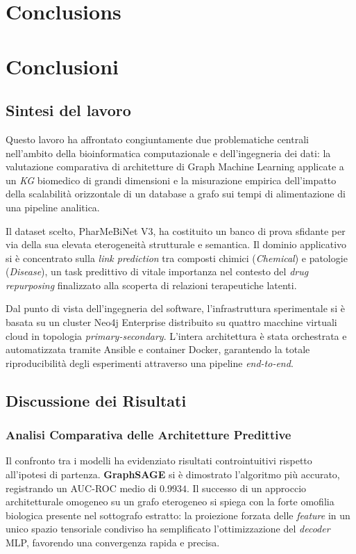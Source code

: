 {\chapter{Conclusions}}
{\chapter{Conclusioni}}
\label{sec:conclusion}

\section{Sintesi del lavoro}
Questo lavoro ha affrontato congiuntamente due problematiche centrali nell'ambito della bioinformatica computazionale e dell'ingegneria dei dati: la valutazione comparativa di architetture di Graph Machine Learning applicate a un \textit{KG} biomedico di grandi dimensioni e la misurazione empirica dell'impatto della scalabilità orizzontale di un database a grafo sui tempi di alimentazione di una pipeline analitica.

Il dataset scelto, PharMeBiNet V3, ha costituito un banco di prova sfidante per via della sua elevata eterogeneità strutturale e semantica. Il dominio applicativo si è concentrato sulla \textit{link prediction} tra composti chimici (\textit{Chemical}) e patologie (\textit{Disease}), un task predittivo di vitale importanza nel contesto del \textit{drug repurposing} finalizzato alla scoperta di relazioni terapeutiche latenti.

Dal punto di vista dell'ingegneria del software, l'infrastruttura sperimentale si è basata su un cluster Neo4j Enterprise distribuito su quattro macchine virtuali cloud in topologia \textit{primary-secondary}. L'intera architettura è stata orchestrata e automatizzata tramite Ansible e container Docker, garantendo la totale riproducibilità degli esperimenti attraverso una pipeline \textit{end-to-end}.

\section{Discussione dei Risultati}
\subsection{Analisi Comparativa delle Architetture Predittive}
Il confronto tra i modelli ha evidenziato risultati controintuitivi rispetto all'ipotesi di partenza. \textbf{GraphSAGE} \cite{hamilton2017inductive} si è dimostrato l'algoritmo più accurato, registrando un AUC-ROC medio di $0.9934$. Il successo di un approccio architetturale omogeneo su un grafo eterogeneo si spiega con la forte omofilia biologica presente nel sottografo estratto: la proiezione forzata delle \textit{feature} in un unico spazio tensoriale condiviso ha semplificato l'ottimizzazione del \textit{decoder} MLP, favorendo una convergenza rapida e precisa.

